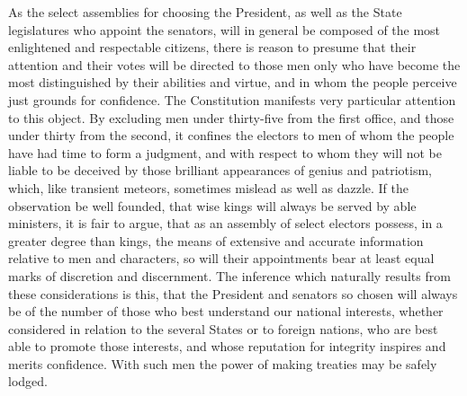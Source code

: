 As the select assemblies for choosing the President, as well as the State legislatures who appoint the senators, will in general be composed of the most enlightened and respectable citizens, there is reason to presume that their attention and their votes will be directed to those men only who have become the most distinguished by their abilities and virtue, and in whom the people perceive just grounds for confidence. 
The Constitution manifests very particular attention to this object. 
By excluding men under thirty-five from the first office, and those under thirty from the second, it confines the electors to men of whom the people have had time to form a judgment, and with respect to whom they will not be liable to be deceived by those brilliant appearances of genius and patriotism, which, like transient meteors, sometimes mislead as well as dazzle. 
If the observation be well founded, that wise kings will always be served by able ministers, it is fair to argue, that as an assembly of select electors possess, in a greater degree than kings, the means of extensive and accurate information relative to men and characters, so will their appointments bear at least equal marks of discretion and discernment. 
The inference which naturally results from these considerations is this, that the President and senators so chosen will always be of the number of those who best understand our national interests, whether considered in relation to the several States or to foreign nations, who are best able to promote those interests, and whose reputation for integrity inspires and merits confidence. 
With such men the power of making treaties may be safely lodged.


